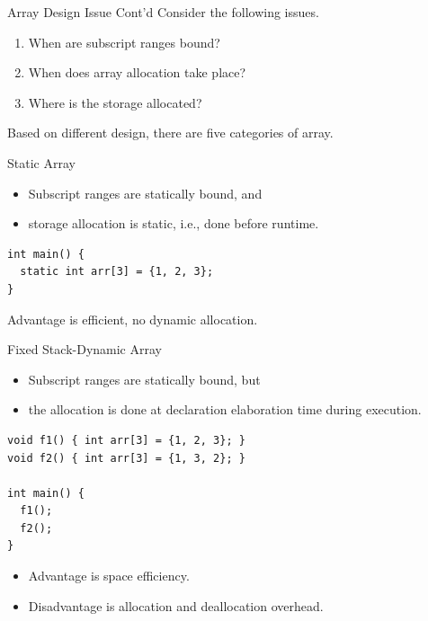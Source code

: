 \documentclass[presentation]{beamer}
\begin{document}
\begin{frame}[label={sec:orgheadline22}]{Array Design Issue Cont'd}
Consider the following issues.

\begin{enumerate}
\item When are subscript ranges bound?
\item When does array allocation take place?
\item Where is the storage allocated?
\end{enumerate}


Based on different design, there are five categories of array.
\end{frame}

\begin{frame}[fragile,label={sec:orgheadline23}]{Static Array}
 \begin{itemize}
\item Subscript ranges are statically bound, and
\item storage allocation is static, i.e., done before runtime.
\end{itemize}


\begin{verbatim}
int main() {
  static int arr[3] = {1, 2, 3};
}
\end{verbatim}

Advantage is efficient, no dynamic allocation.
\end{frame}

\begin{frame}[fragile,label={sec:orgheadline24}]{Fixed Stack-Dynamic Array}
 \begin{itemize}
\item Subscript ranges are statically bound, but
\item the allocation is done at declaration elaboration time during
execution.
\end{itemize}


\begin{verbatim}
void f1() { int arr[3] = {1, 2, 3}; }
void f2() { int arr[3] = {1, 3, 2}; }

int main() {
  f1();
  f2();
}
\end{verbatim}

\begin{itemize}
\item Advantage is space efficiency.
\item Disadvantage is allocation and deallocation overhead.
\end{itemize}
\end{frame}
\end{document}
